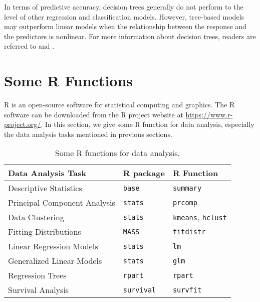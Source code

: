 \documentclass[12pt]{article}
\begin{document}
In terms of predictive accuracy, decision trees generally do not perform to the level of other regression and classification models. However, tree-based models may outperform linear models when the relationship between the response and the predictors is nonlinear. For more information about decision trees, readers are referred to \citep{breiman1984} and \citep{mitchell1997}. 


 
 
\section{Some R Functions}


R is an open-source software for statistical computing and graphics. The R software can be downloaded from the R project website at \url{https://www.r-project.org/}. In this section, we give some R function for data analysis, especially the data analysis tasks mentioned in previous sections. 


\begin{table}[htbp]
\centering
\caption{Some R functions for data analysis.}\label{tbl:rfun}
\begin{tabular}{lll}
\toprule
Data Analysis Task & R package & R Function\\
\midrule
Descriptive Statistics & \texttt{base} & \texttt{summary}\\
Principal Component Analysis & \texttt{stats} & \texttt{prcomp} \\
Data Clustering & \texttt{stats} & \texttt{kmeans}, \texttt{hclust} \\
Fitting Distributions & \texttt{MASS} & \texttt{fitdistr} \\
Linear Regression Models & \texttt{stats} & \texttt{lm} \\
Generalized Linear Models & \texttt{stats} & \texttt{glm} \\
Regression Trees & \texttt{rpart} & \texttt{rpart} \\
Survival Analysis & \texttt{survival} & \texttt{survfit} \\
\bottomrule
\end{tabular}
\end{table}
\end{document}
